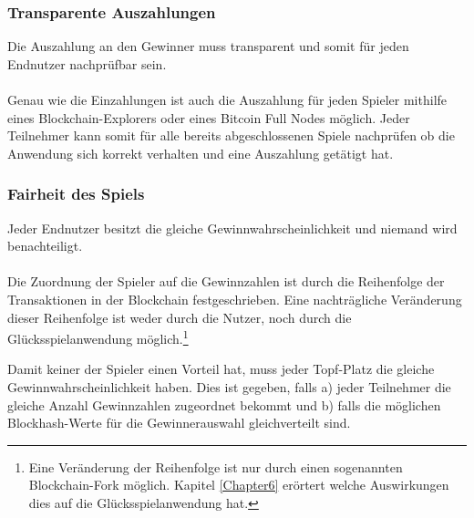 \subsubsection{Transparente Auszahlungen}
Die Auszahlung an den Gewinner muss transparent und somit für jeden Endnutzer nachprüfbar sein.\\\\
Genau wie die Einzahlungen ist auch die Auszahlung für jeden Spieler mithilfe eines Blockchain-Explorers oder eines Bitcoin Full Nodes möglich. Jeder Teilnehmer kann somit für alle bereits abgeschlossenen Spiele nachprüfen ob die Anwendung sich korrekt verhalten und eine Auszahlung getätigt hat. 
\subsubsection{Fairheit des Spiels}
Jeder Endnutzer besitzt die gleiche Gewinnwahrscheinlichkeit und niemand wird benachteiligt.\\\\
Die Zuordnung der Spieler auf die Gewinnzahlen ist durch die Reihenfolge der Transaktionen in der Blockchain festgeschrieben. Eine nachträgliche Veränderung dieser Reihenfolge ist weder durch die Nutzer, noch durch die Glücksspielanwendung möglich.\footnote{Eine Veränderung der Reihenfolge ist nur durch einen sogenannten Blockchain-Fork möglich. Kapitel \ref{Chapter6} erörtert welche Auswirkungen dies auf die Glücksspielanwendung hat.}

Damit keiner der Spieler einen Vorteil hat, muss jeder Topf-Platz die gleiche Gewinnwahrscheinlichkeit haben.
Dies ist gegeben, falls a) jeder Teilnehmer die gleiche Anzahl Gewinnzahlen zugeordnet bekommt und b) falls die möglichen Blockhash-Werte für die Gewinnerauswahl gleichverteilt sind.\\

